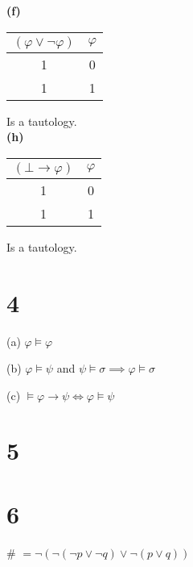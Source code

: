 \documentclass[10pt]{article}
\begin{document}
\noindent \textbf{(f)}

\begin{tabular}{ c || c }			
  $(\varphi \lor \lnot \varphi)$ & $\varphi$ \\
  \hline
  1 & 0 \\
  1 & 1 \\
  \hline  
\end{tabular}
Is a tautology.\\

\noindent \textbf{(h)}

\begin{tabular}{ c || c }			
  $(\bot \to \varphi)$ & $\varphi$ \\
  \hline
  1 & 0 \\
  1 & 1 \\
  \hline  
\end{tabular}
Is a tautology.


\section*{4}
\begin{description*}
  \item[(a)] $\varphi \models \varphi$


  \item[(b)] $\varphi \models \psi$ and $\psi \models \sigma \implies \varphi \models \sigma$

  \item[(c)] $\models \varphi \to \psi \iff \varphi \models \psi$


\end{description*}



\section*{5}



\section*{6}
{\small \#} $= \lnot (\lnot (\lnot p \lor \lnot q) \lor \lnot (p \lor q))$

\end{document}
